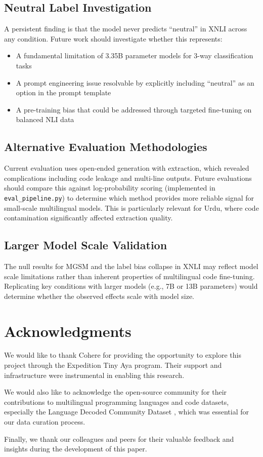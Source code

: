 \documentclass[conference]{IEEEtran}
\begin{document}
\subsection{Neutral Label Investigation}
A persistent finding is that the model never predicts ``neutral'' in XNLI across any condition. Future work should investigate whether this represents:
\begin{itemize}
\item A fundamental limitation of 3.35B parameter models for 3-way classification tasks
\item A prompt engineering issue resolvable by explicitly including ``neutral'' as an option in the prompt template
\item A pre-training bias that could be addressed through targeted fine-tuning on balanced NLI data
\end{itemize}

\subsection{Alternative Evaluation Methodologies}
Current evaluation uses open-ended generation with extraction, which revealed complications including code leakage and multi-line outputs. Future evaluations should compare this against log-probability scoring (implemented in \texttt{eval\_pipeline.py}) to determine which method provides more reliable signal for small-scale multilingual models. This is particularly relevant for Urdu, where code contamination significantly affected extraction quality.

\subsection{Larger Model Scale Validation}
The null results for MGSM and the label bias collapse in XNLI may reflect model scale limitations rather than inherent properties of multilingual code fine-tuning. Replicating key conditions with larger models (e.g., 7B or 13B parameters) would determine whether the observed effects scale with model size.

\section{Acknowledgments}
We would like to thank Cohere for providing the opportunity to explore this project through the Expedition Tiny Aya program. Their support and infrastructure were instrumental in enabling this research.

We would also like to acknowledge the open-source community for their contributions to multilingual programming languages and code datasets, especially the Language Decoded Community Dataset \cite{legesher_language_decoded_community}, which was essential for our data curation process.

Finally, we thank our colleagues and peers for their valuable feedback and insights during the development of this paper.




\end{document}
